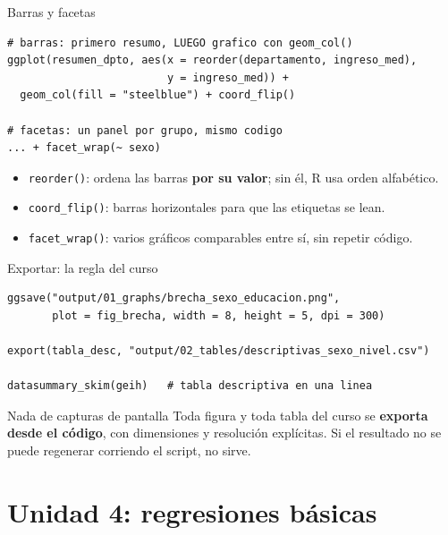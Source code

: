 \documentclass[10pt]{beamer}
\begin{document}
\begin{frame}[fragile]{Barras y facetas}
\begin{lstlisting}
# barras: primero resumo, LUEGO grafico con geom_col()
ggplot(resumen_dpto, aes(x = reorder(departamento, ingreso_med),
                         y = ingreso_med)) +
  geom_col(fill = "steelblue") + coord_flip()

# facetas: un panel por grupo, mismo codigo
... + facet_wrap(~ sexo)
\end{lstlisting}
  \begin{itemize}
    \item \texttt{reorder()}: ordena las barras \textbf{por su valor}; sin él, R usa orden alfabético.
    \item \texttt{coord\_flip()}: barras horizontales para que las etiquetas se lean.
    \item \texttt{facet\_wrap()}: varios gráficos comparables entre sí, sin repetir código.
  \end{itemize}
\end{frame}

\begin{frame}[fragile]{Exportar: la regla del curso}
\begin{lstlisting}
ggsave("output/01_graphs/brecha_sexo_educacion.png",
       plot = fig_brecha, width = 8, height = 5, dpi = 300)

export(tabla_desc, "output/02_tables/descriptivas_sexo_nivel.csv")

datasummary_skim(geih)   # tabla descriptiva en una linea
\end{lstlisting}
  \begin{alertblock}{Nada de capturas de pantalla}
    Toda figura y toda tabla del curso se \textbf{exporta desde el código}, con dimensiones y resolución explícitas. Si el resultado no se puede regenerar corriendo el script, no sirve.
  \end{alertblock}
\end{frame}

\section{Unidad 4: regresiones básicas}
\end{document}
